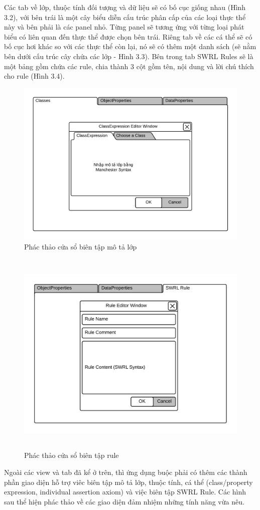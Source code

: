 Các tab về lớp, thuộc tính đối tượng và dữ liệu sẽ có bố cục giống nhau (Hình 3.2), với bên trái là một cây biểu diễn cấu trúc phân cấp của các loại thực thể này và bên phải là các panel nhỏ. Từng panel sẽ tương ứng với từng loại phát biểu có liên quan đến thực thể được chọn bên trái. Riêng tab về các cá thể sẽ có bố cục hơi khác so với các thực thể còn lại, nó sẽ có thêm một danh sách (sẽ nằm bên dưới cấu trúc cây chứa các lớp - Hình 3.3). Bên trong tab SWRL Rules sẽ là một bảng gồm chứa các rule, chia thành 3 cột gồm tên, nội dung và lời chú thích cho rule (Hình 3.4).
\begin{figure}[h!]
	\centering
	\includegraphics[width=150mm]{Figures/ui_classexpressioneditor.png}
	\caption{Phác thảo cửa sổ biên tập mô tả lớp\label{overflow}}
\end{figure}
\begin{figure}[h!]
	\centering
	\includegraphics[width=150mm,height=100mm]{Figures/ui_mainview_ruleeditor.png}
	\caption{Phác thảo cửa sổ biên tập rule \label{overflow}}
\end{figure}
Ngoài các view và tab đã kể ở trên, thì ứng dụng buộc phải có thêm các thành phần giao diện hỗ trợ viêc biên tập mô tả lớp, thuộc tính, cá thể (class/property expression, individual assertion axiom) và việc biên tập SWRL Rule. Các hình sau thể hiện phác thảo về các giao diện đảm nhiệm những tính năng vừa nêu.